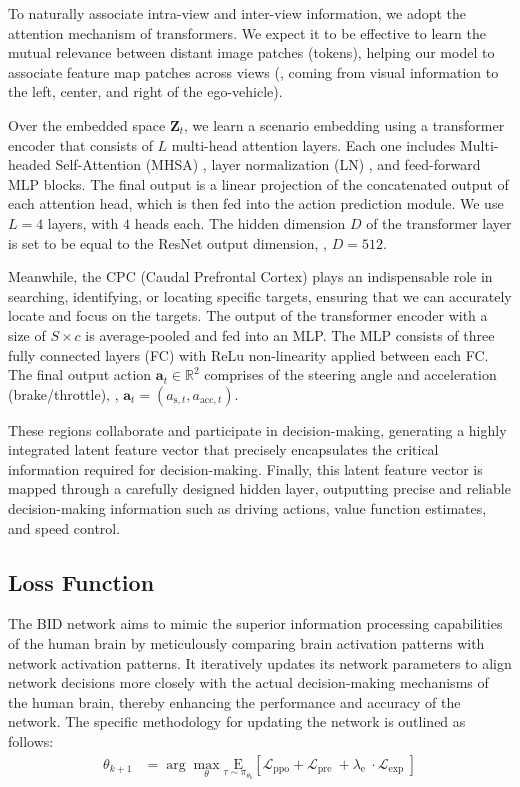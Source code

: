 To naturally associate intra-view and inter-view information, we adopt the attention mechanism of transformers\cite{Vaswani:2017}. 
We expect it to be effective to learn the mutual relevance between distant image patches (tokens), helping our model to associate feature map patches across views ({\ie}, coming from visual information to the left, center, and right of the ego-vehicle). 


Over the embedded space $\mathbf{Z}_{t}$, we learn a scenario embedding using a transformer encoder that consists of $L$ multi-head attention layers. 
Each one includes Multi-headed Self-Attention (MHSA) \cite{Vaswani:2017}, layer normalization (LN) \cite{Ba:2016}, and feed-forward MLP blocks.  
The final output is a linear projection of the concatenated output of each attention head, which is then fed into the action prediction module. We use $L=4$ layers, with $4$ heads each. The hidden dimension $D$ of the transformer layer is set to be equal to the ResNet output dimension, {\ie}, $D=512$. 


Meanwhile, the CPC (Caudal Prefrontal Cortex) plays an indispensable role in searching, identifying, or locating specific targets, ensuring that we can accurately locate and focus on the targets. 
The output of the transformer encoder with a size of $S\times c$ is average-pooled and fed into an MLP. 
The MLP consists of three fully connected layers (FC) with ReLu non-linearity applied between each FC. 
The final output action $\mathbf{a}_t\in\mathbb{R}^2$ comprises of the steering angle and acceleration (brake/throttle), {\ie}, $\mathbf{a}_{t} = (a_{\text{s},t}, a_{\text{acc}, t})$. 


These regions collaborate and participate in decision-making, generating a highly integrated latent feature vector that precisely encapsulates the critical information required for decision-making. 
Finally, this latent feature vector is mapped through a carefully designed hidden layer, outputting precise and reliable decision-making information such as driving actions, value function estimates, and speed control.


\subsection{Loss Function}
The BID network aims to mimic the superior information processing capabilities of the human brain by meticulously comparing brain activation patterns with network activation patterns. 
It iteratively updates its network parameters to align network decisions more closely with the actual decision-making mechanisms of the human brain, thereby enhancing the performance and accuracy of the network. 
The specific methodology for updating the network is outlined as follows:
\begin{align}
	\theta_{k+1} & = \arg \max _{\theta} \underset{\tau \sim \pi_{\theta_{k}}}{\mathrm{E}}\left[\mathcal{L}_{\mathrm{ppo}}+\mathcal{L}_{\text {pre }}+\lambda_{\text {e }} \cdot \mathcal{L}_{\text {exp }}\right]
\end{align}

